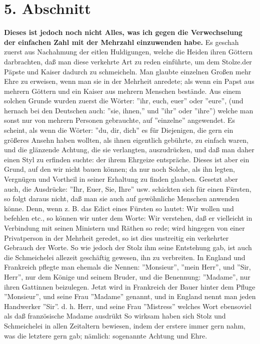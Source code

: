 \section{5. Abschnitt} \label{kap10_ab5}

\textbf{Dieses ist jedoch noch nicht Alles, was ich gegen die Verwechselung der
einfachen Zahl mit der Mehrzahl einzuwenden habe.} Es geschah zuerst aus
Nachahmung der eitlen Huldigungen, welche die Heiden ihren Göttern darbrachten,
daß man diese verkehrte Art zu reden einführte, um dem Stolze.der Päpste und
Kaiser dadurch zu schmeicheln. Man glaubte einzelnen Großen mehr Ehre zu
erweisen, wenn man sie in der Mehrheit anredete; als wenn ein Papst aus mehrern
Göttern und ein Kaiser aus mehrern Menschen bestände. Aus einem solchen Grunde
wurden zuerst die Wörter: ''ihr, euch, euer'' oder ''eure'', (und hernach bei
den Deutschen auch: ''sie, ihnen,'' und ''ihr'' oder ''ihre'') welche man sonst
nur von mehrern Personen gebrauchte, auf ''einzelne'' angewendet. Es scheint,
als wenn die Wörter: ''du, dir, dich'' es für Diejenigen, die gern ein größeres
Ansehn haben wollten, als ihnen eigentlich gebührte, zu einfach waren, und die
glänzende Achtung, die sie verlangten, auszudrücken, und daß man daher einen
Styl zu erfinden suchte: der ihrem Ehrgeize entspräche. Dieses ist aber ein
Grund, auf den wir nicht bauen können; da nur noch Solche, als ihn legten,
Vergnügen und Vortheil in seiner Erhaltung zu finden glauben. Gesetzt aber auch,
die Ausdrücke: ''Ihr, Euer, Sie, Ihre'' usw. schickten sich für einen Fürsten,
so folgt daraus nicht, daß man sie auch auf gewöhnliche Menschen anwenden könne.
Denn, wenn z. B. das Edict eines Fürsten so lautet: Wir wollen und befehlen
etc., so können wir unter dem Worte: Wir verstehen, daß er vielleicht in
Verbindung mit seinen Ministern und Räthen so rede; wird hingegen von einer
Privatperson in der Mehrheit geredet, so ist dies unstreitig ein verkehrter
Gebrauch der Worte. So wie jedoch der Stolz ihm seine Entstehung gab, ist auch
die Schmeichelei allezeit geschäftig gewesen, ihn zu verbreiten. In England und
Frankreich pflegte man ehemals die Nennen: ''Monsieur'', ''mein Herr'', und
''Sir, Herr'', nur dem Könige und seinem Bruder, und die Benennung: ''Madame'',
nur ihren Gattinnen beizulegen. Jetzt wird in Frankreich der Bauer hinter dem
Pfluge ''Monsieur'', und seine Frau ''Madame'' genannt, und in England nennt man
jeden Handwerker ''Sir''. d. h. Herr, und seine Frau ''Mistress'' welches Wort
ebensoviel als daß französische Madame ausdrükt So wirksam haben sich Stolz und
Schmeichelei in allen Zeitaltern bewiesen, indem der erstere immer gern nahm,
was die letztere gern gab; nämlich: sogenannte Achtung und Ehre.

